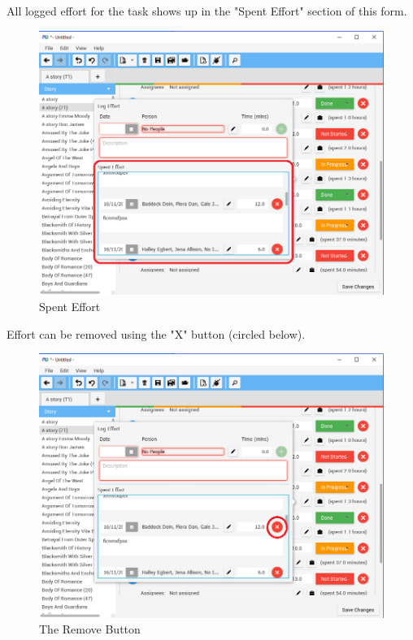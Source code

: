 All logged effort for the task shows up in the "Spent Effort" section of this form. 

\begin{figure}[H]
\centering
\includegraphics[width=\textwidth]{images/screenshots/logging4.png}
\caption{Spent Effort}
\label{fig:new_project}
\end{figure}

Effort can be removed using the "X" button (circled below).

\begin{figure}[H]
\centering
\includegraphics[width=\textwidth]{images/screenshots/logging5.png}
\caption{The Remove Button}
\label{fig:new_project}
\end{figure}